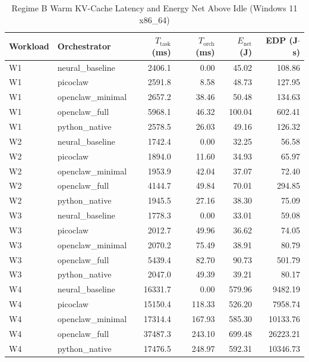 \begin{table}[t]
\centering\small
\caption{Regime B Warm KV-Cache Latency and Energy Net Above Idle (Windows 11 x86_64)}
\label{tab:Windows_warm_cache}
\begin{tabular}{llrrrr}
\toprule
Workload & Orchestrator & $T_{\text{task}}$ (ms) & $T_{\text{orch}}$ (ms) & $E_{\text{net}}$ (J) & EDP (J$\cdot$s) \\
\midrule
W1 & neural\_baseline & 2406.1 & 0.00 & 45.02 & 108.86 \\
W1 & picoclaw & 2591.8 & 8.58 & 48.73 & 127.95 \\
W1 & openclaw\_minimal & 2657.2 & 38.46 & 50.48 & 134.63 \\
W1 & openclaw\_full & 5968.1 & 46.32 & 100.04 & 602.41 \\
W1 & python\_native & 2578.5 & 26.03 & 49.16 & 126.32 \\
W2 & neural\_baseline & 1742.4 & 0.00 & 32.25 & 56.58 \\
W2 & picoclaw & 1894.0 & 11.60 & 34.93 & 65.97 \\
W2 & openclaw\_minimal & 1953.9 & 42.04 & 37.07 & 72.40 \\
W2 & openclaw\_full & 4144.7 & 49.84 & 70.01 & 294.85 \\
W2 & python\_native & 1945.5 & 27.16 & 38.30 & 75.09 \\
W3 & neural\_baseline & 1778.3 & 0.00 & 33.01 & 59.08 \\
W3 & picoclaw & 2012.7 & 49.96 & 36.62 & 74.05 \\
W3 & openclaw\_minimal & 2070.2 & 75.49 & 38.91 & 80.79 \\
W3 & openclaw\_full & 5439.4 & 82.70 & 90.73 & 501.79 \\
W3 & python\_native & 2047.0 & 49.39 & 39.21 & 80.17 \\
W4 & neural\_baseline & 16331.7 & 0.00 & 579.96 & 9482.19 \\
W4 & picoclaw & 15150.4 & 118.33 & 526.20 & 7958.74 \\
W4 & openclaw\_minimal & 17314.4 & 167.93 & 585.30 & 10133.76 \\
W4 & openclaw\_full & 37487.3 & 243.10 & 699.48 & 26223.21 \\
W4 & python\_native & 17476.5 & 248.97 & 592.31 & 10346.73 \\
\bottomrule
\end{tabular}
\end{table}
